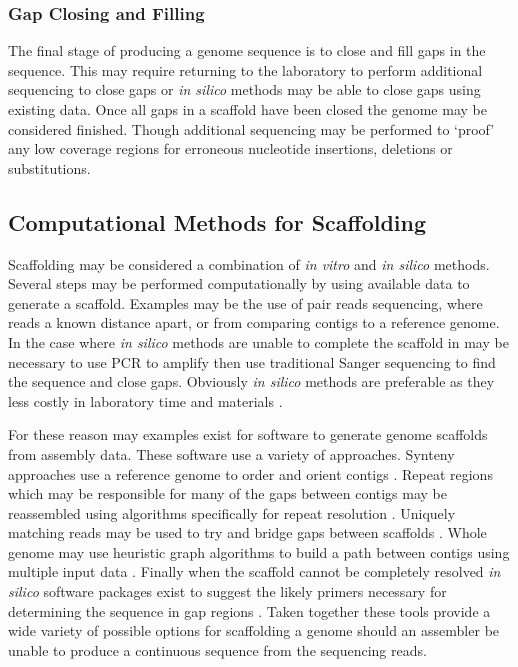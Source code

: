 \documentclass[10pt]{bmc_article}
\newenvironment{bmcformat}{\begin{raggedright}\baselineskip20pt\sloppy\setboolean{publ}{false}}{\end{raggedright}\baselineskip20pt\sloppy}
\begin{document}
\begin{bmcformat}
\subsubsection*{Gap Closing and Filling} %

The final stage of producing a genome sequence is to close and fill gaps in
the sequence. This may require returning to the laboratory to perform
additional sequencing to close gaps or \emph{in silico} methods may be able to
close gaps using existing data. Once all gaps in a scaffold have been closed
the genome may be considered finished. Though additional sequencing may be
performed to `proof' any low coverage regions for erroneous nucleotide
insertions, deletions or substitutions.

\subsection*{Computational Methods for Scaffolding} %

Scaffolding may be considered a combination of \emph{in vitro} and \emph{in
silico} methods. Several steps may be performed computationally by using
available data to generate a scaffold. Examples may be the use of pair reads
sequencing, where reads a known distance apart, or from comparing contigs to
a reference genome. In the case where \emph{in silico} methods are unable to
complete the scaffold in may be necessary to use PCR to amplify then use
traditional Sanger sequencing to find the sequence and close gaps. Obviously
\emph{in silico} methods are preferable as they less costly in laboratory time
and materials \cite{nagaryan2010}. \pb

For these reason may examples exist for software to generate genome scaffolds
from assembly data. These software use a variety of approaches. Synteny
approaches use a reference genome to order and orient contigs
\cite{richter2007,zhao2008}. Repeat regions which may be responsible for many
of the gaps between contigs may be reassembled using algorithms specifically
for repeat resolution \cite{mulkov2002,koren2010}. Uniquely matching reads may
be used to try and bridge gaps between scaffolds \cite{tsai2010}. Whole genome
may use heuristic graph algorithms to build a path between contigs using
multiple input data \cite{pop2004,dayarian2010}. Finally when the scaffold
cannot be completely resolved \emph{in silico} software packages exist to
suggest the likely primers necessary for determining the sequence in gap
regions \cite{gordon2001,nagaryan2010}. Taken together these tools provide
a wide variety of possible options for scaffolding a genome should an
assembler be unable to produce a continuous sequence from the sequencing
reads. \pb


\end{bmcformat}
\end{document}
